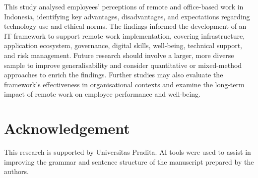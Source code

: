\documentclass{infotel}
\begin{document}
This study analysed employees' perceptions of remote and office-based work in Indonesia, identifying key advantages, disadvantages, and expectations regarding technology use and ethical norms. The findings informed the development of an IT framework to support remote work implementation, covering infrastructure, application ecosystem, governance, digital skills, well-being, technical support, and risk management. Future research should involve a larger, more diverse sample to improve generalisability and consider quantitative or mixed-method approaches to enrich the findings. Further studies may also evaluate the framework's effectiveness in organisational contexts and examine the long-term impact of remote work on employee performance and well-being.

\section*{Acknowledgement}

This research is supported by Universitas Pradita. AI tools were used to assist in improving the grammar and sentence structure of the manuscript prepared by the authors.



\end{document}
